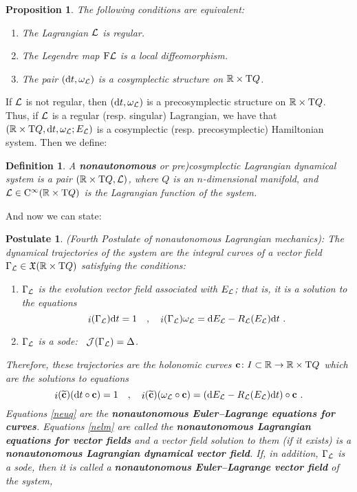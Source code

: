 \documentclass[12pt]{report}
\newtheorem{prop}[teor]{Proposition}
\newtheorem{definition}[teor]{Definition}
\newtheorem{pos}[teor]{Postulate}
\def\beq{\begin{equation}}
\def\eeq{\end{equation}}
\def\ben{\begin{enumerate}}
\def\een{\end{enumerate}}
\def\vf{\mathfrak X}
\def\Lag{{\cal L}}
\def\d{{\rm d}}
\def\Real{\mathbb{R}}
\def\Tan{{\rm T}}
\def\inn{\mathop{i}\nolimits}
\def\Cinfty{{\rm C}^\infty}
\begin{document}
\begin{prop}  
\label{equinona}
The following conditions are equivalent:
\ben
\item
The Lagrangian $\Lag$ is regular.
\item
The Legendre map ${\rm F}\Lag$  is a local diffeomorphism. 
\item
The pair 
$(\d t,\omega_\Lag)$ is a cosymplectic structure on $\Real\times\Tan Q$.
\een
\end{prop}

If $\Lag$ is not regular, then $(\d t,\omega_\Lag)$ is a precosymplectic structure on $\Real\times\Tan Q$.
Thus, if $\Lag$ is a regular (resp. singular) Lagrangian,
we have that $(\Real\times\Tan Q,\d t,\omega_\Lag;E_\Lag)$ is a 
cosymplectic (resp. precosymplectic) Hamiltonian system.
Then we define:

\begin{definition}
A \textbf{nonautonomous} or {\rm pre)cosymplectic Lagrangian dynamical system}
is a pair $(\Real\times\Tan Q,\Lag )$,
where $Q$ is an $n$-dimensional manifold,
and $\Lag \in \Cinfty (\Real\times\Tan Q)$ is the Lagrangian function of the system.
\label{stdlr}
\end{definition}

And now we can state:

\begin{pos}
{\rm (Fourth Postulate of nonautonomous Lagrangian mechanics\/)}:
The dynamical trajectories of the system are the integral curves
of a vector field $\Gamma_\Lag\in \vf(\Real\times\Tan Q)$ satisfying the conditions:
\ben
\item
$\Gamma_\Lag$ is the evolution vector field associated with $E_\Lag$;
that is, it is a solution to the equations
\beq
\inn(\Gamma_\Lag)\d t=1 \quad,\quad
\inn (\Gamma_\Lag)\omega_\Lag = \d E_\Lag- R_\Lag(E_\Lag)\d t \ .
\label{nelm}
\eeq
\item
$\Gamma_\Lag$ is a {\sc sode}:
\ ${\cal J}(\Gamma_\Lag ) = \Delta$.
\een
Therefore, these trajectories are the holonomic curves 
${\bf c}\colon I\subset\Real\to\Real\times\Tan Q$
which are the solutions to equations
\beq
\inn(\widetilde{\bf c})(\d t\circ{\bf c})=1 \quad  , \quad
\inn(\widetilde{\bf c})(\omega_\Lag\circ{\bf c})= (\d E_\Lag -R_\Lag(E_\Lag)\d t)\circ {\bf c}\ .
\label{neuq}
\eeq
Equations \eqref{neuq} are the
 \textbf{nonautonomous Euler--Lagrange equations for curves}.
Equations \eqref{nelm} are called the
 \textbf{nonautonomous Lagrangian equations for vector fields} and
a vector field solution to them (if it exists) is a
\textbf{nonautonomous Lagrangian dynamical vector field}.
If, in addition, $\Gamma_\Lag$ is a {\sc sode}, then
it is called a \textbf{nonautonomous Euler--Lagrange vector field} of the system, 
\end{pos}
\end{document}
